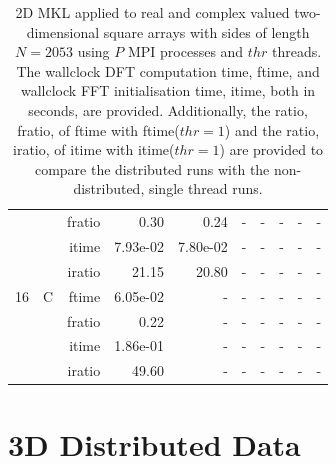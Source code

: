 \documentclass[a4paper]{article}
\begin{document}
\begin{table}[htbp]
\begin{center}
\begin{small}
\begin{tabular}{|r|r|r|r|r|r|r|r|r|r|}
          &      & fratio & 0.30 & 0.24 &     -     &     -     &     -     &     -     &     -     \\   
          &      & itime & 7.93e-02 & 7.80e-02 &     -     &     -     &     -     &     -     &     -     \\   
          &      & iratio & 21.15 & 20.80 &     -     &     -     &     -     &     -     &     -     \\ \hline 
     16 & C & ftime & 6.05e-02 &     -     &     -     &     -     &     -     &     -     &     -     \\   
          &      & fratio & 0.22 &     -     &     -     &     -     &     -     &     -     &     -     \\   
          &      & itime & 1.86e-01 &     -     &     -     &     -     &     -     &     -     &     -     \\   
          &      & iratio & 49.60 &     -     &     -     &     -     &     -     &     -     &     -     \\ \hline 
\end{tabular}
\caption{2D MKL applied to real and complex valued two-dimensional square arrays with sides of length $N=2053$ using $P$ MPI processes and $thr$ threads. The wallclock DFT computation time, ftime, and wallclock FFT initialisation time, itime, both in seconds, are provided. Additionally, the ratio, fratio, of ftime  with ftime($thr=1$) and the ratio, iratio, of itime  with itime($thr=1$) are provided to compare the distributed runs with the non-distributed, single thread runs.  }\label{TblMKL2d2053}
\end{small}
\end{center}
\end{table}


\clearpage

\section{3D Distributed Data}\label{App:3Ddist}
\end{document}
